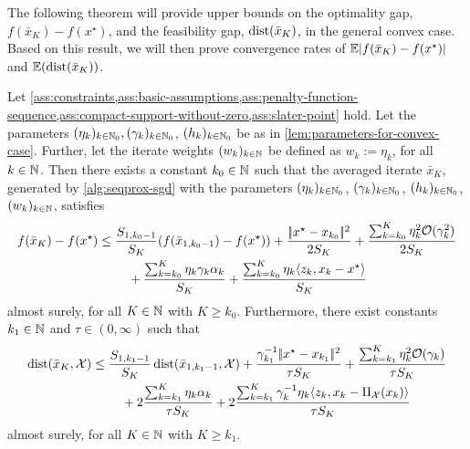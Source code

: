 The following theorem will provide upper bounds on the optimality gap, $f(\bar{x}_K) - f(x^\star)$,
and the feasibility gap, $\operatorname{dist}(\bar{x}_K)$, in the general convex case. Based on this result,
we will then prove convergence
rates of $\mathbb{E}|f(\bar{x}_K) - f(x^\star)|$ and $\mathbb{E}(\operatorname{dist}(\bar{x}_K))$.
\begin{theorem}
    \label{thm:upper-bound-on-f(xk)-f(xstar)-and-dist(xk)-convex-case}
    Let \cref{ass:constraints,ass:basic-assumptions,ass:penalty-function-sequence,ass:compact-support-without-zero,ass:slater-point}
    hold.
    Let the parameters $(\eta_k)_{k\in\mathbb{N}_0}, (\gamma_k)_{k\in\mathbb{N}_0}$, $(h_k)_{k\in\mathbb{N}_0}$
    be as in \cref{lem:parameters-for-convex-case}.
    Further, let the iterate weights $(w_k)_{k\in\mathbb{N}}$
    be defined as $w_k := \eta_k$, for all $k\in\mathbb{N}$.
    Then there exists a constant $k_0\in\mathbb{N}$
    such that the averaged iterate $\bar{x}_K$, generated by \cref{alg:seqprox-sgd}
    with the parameters $(\eta_k)_{k\in\mathbb{N}_0}$, $(\gamma_k)_{k\in\mathbb{N}_0}$, $(h_k)_{k\in\mathbb{N}_0}$, $(w_k)_{k\in\mathbb{N}}$,
    satisfies
    \begin{align*}
        f(\bar{x}_K) - f(x^\star)
        &\leq
        \frac{S_{1, k_0-1}}{S_K} (f(\bar{x}_{1, k_0-1}) - f(x^\star))
        + \frac{|\!|x^\star - x_{k_0}|\!|^2}{2S_K}
        + \frac{\sum_{k=k_0}^{K} \eta_k^2\mathcal{O}(\gamma_k^2)}{2 S_K} \notag \\
        &\phantom{===}
            + \frac{\sum_{k=k_0}^K \eta_k\gamma_k\alpha_k}{S_K}
            + \frac{\sum_{k=k_0}^K \eta_k\langle z_k, x_k - x^\star \rangle}{S_K}
    \end{align*}
    almost surely,
    for all $K\in\mathbb{N}$ with $K \geq k_0$.
    Furthermore, there exist constants $k_1\in\mathbb{N}$ and $\tau \in (0, \infty)$ such that
    \begin{align*}
        \operatorname{dist}(\bar{x}_K, \mathcal{X})
        &\leq
        \frac{S_{1, k_1-1}}{S_K} \operatorname{dist}(\bar{x}_{1, k_1-1}, \mathcal{X})
            + \frac{\gamma_{k_1}^{-1}|\!|x^\star - x_{k_1}|\!|^2}{\tau S_K}
            + \frac{\sum_{k=k_1}^{K} \eta_k^2\mathcal{O}(\gamma_k)}{\tau S_K} \\
        &\phantom{===}
            + 2 \frac{\sum_{k=k_1}^{K}\eta_k\alpha_k}{\tau S_K}
            + 2 \frac{\sum_{k=k_1}^K \gamma_k^{-1}\eta_k \langle z_k, x_k - \operatorname{\Pi_\mathcal{X}}(x_k) \rangle}{\tau S_K}
    \end{align*} 
    almost surely, for all $K\in\mathbb{N}$ with $K \geq k_1$.
\end{theorem}
